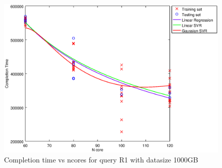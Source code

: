 
\begin {figure}[hbtp]
\centering
\includegraphics[width=\textwidth]{output/R1_1000_ONLY_1_OVER_NCORES/plot_R1_1000_bestmodels.eps}
\caption{Completion time vs ncores for query R1 with datasize 1000GB}
\label{fig:all_nonlinear_R1_1000}
\end {figure}
